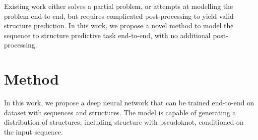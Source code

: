 \documentclass{article}
\begin{document}
Existing work either solves a partial problem, or attempts at modelling the problem end-to-end,
but requires complicated post-processing to yield valid structure prediction.
In this work, we propose a novel method to model the sequence to structure predictive task end-to-end, with
no additional post-processing.









%


%
%
%
%


\section{Method}


In this work, we propose a deep neural network that can be trained end-to-end on dataset with sequences and structures.
The model is capable of generating a distribution of structures, including structure with pseudoknot,
conditioned on the input sequence.
\end{document}
